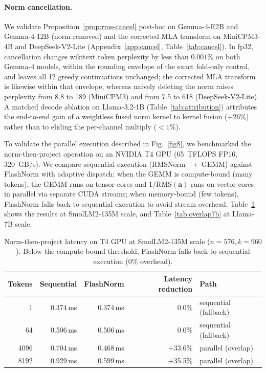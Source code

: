 \documentclass{article}
\begin{document}
\paragraph{Norm cancellation.} We validate Proposition~\ref{prop:rms-cancel} post-hoc on Gemma-4-E2B and Gemma-4-12B (norm removed) and the corrected MLA transform on MiniCPM3-4B and DeepSeek-V2-Lite (Appendix~\ref{app:cancel}, Table~\ref{tab:cancel}). In fp32, cancellation changes wikitext token perplexity by less than $0.001\%$ on both Gemma-4 models, within the rounding envelope of the exact fold-only control, and leaves all 12 greedy continuations unchanged; the corrected MLA transform is likewise within that envelope, whereas naively deleting the norm raises perplexity from 8.8 to 189 (MiniCPM3) and from 7.5 to 618 (DeepSeek-V2-Lite). A matched decode ablation on Llama-3.2-1B (Table~\ref{tab:attribution}) attributes the end-to-end gain of a weightless fused norm kernel to kernel fusion ($+26\%$) rather than to eliding the per-channel multiply ($<1\%$).

To validate the parallel execution described in Fig.~\ref{fig8}, we benchmarked the norm-then-project operation on an NVIDIA T4 GPU (65~TFLOPS FP16, 320~GB/s). We compare sequential execution (RMSNorm $\rightarrow$ GEMM) against FlashNorm with adaptive dispatch: when the GEMM is compute-bound (many tokens), the GEMM runs on tensor cores and $1/\mathrm{RMS}(\mathbf{a})$ runs on vector cores in parallel via separate CUDA streams; when memory-bound (few tokens), FlashNorm falls back to sequential execution to avoid stream overhead. Table~\ref{tab:overlap} shows the results at SmolLM2-135M scale, and Table~\ref{tab:overlap7b} at Llama-7B scale.

\begin{table}[h!] \centering
\caption{Norm-then-project latency on T4 GPU at SmolLM2-135M scale ($n{=}576, k{=}960$). Below the compute-bound threshold, FlashNorm falls back to sequential execution (0\% overhead).}
\label{tab:overlap}
\begin{tabular}{r r r r l}
\hline
Tokens & Sequential & FlashNorm & Latency reduction & Path \\
\hline
1      & 0.374\,ms & 0.374\,ms & $0.0$\% & sequential (fallback) \\
64     & 0.506\,ms & 0.506\,ms & $0.0$\% & sequential (fallback) \\
4096   & 0.704\,ms & 0.468\,ms & $+$33.6\% & parallel (overlap) \\
8192   & 0.929\,ms & 0.599\,ms & $+$35.5\% & parallel (overlap) \\
\hline
\end{tabular}
\end{table}
\end{document}
